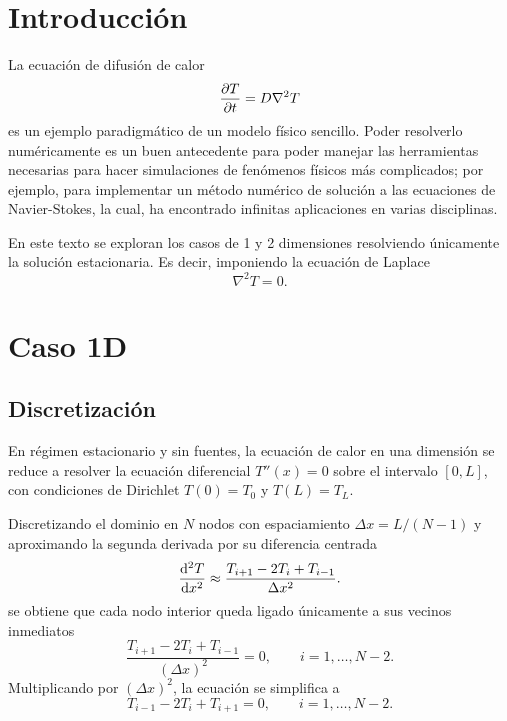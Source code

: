 \documentclass[12pt,twocolumn]{article}
\begin{document}
\tableofcontents
\section{Introducción}

La ecuación de difusión de calor 
$$\pdv{T}{t}=D\nabla^2T$$
es un ejemplo paradigmático de un modelo físico sencillo. Poder resolverlo numéricamente es un buen antecedente para poder manejar las herramientas necesarias para hacer simulaciones de fenómenos físicos más complicados; por ejemplo, para implementar un método numérico de solución a las ecuaciones de Navier-Stokes, la cual, ha encontrado infinitas aplicaciones en varias disciplinas.

En este texto se exploran los casos de 1 y 2 dimensiones resolviendo únicamente la solución estacionaria. Es decir, imponiendo la ecuación de Laplace
$$\nabla^2T = 0.$$



\section{Caso 1D}

\subsection{Discretización}
En régimen estacionario y sin fuentes, la ecuación de calor en una dimensión se reduce a resolver la ecuación diferencial $T''(x) = 0$ sobre el intervalo $[0,L]$, con condiciones de
Dirichlet $T(0)=T_0$ y $T(L)=T_L$.

Discretizando el dominio en $N$ nodos con espaciamiento $\Delta x = L/(N-1)$
y aproximando la segunda derivada por su diferencia centrada
$$
\dv[2]{T}{x}\approx\frac{T_{i+1}-2T_i+T_{i-1}}{\Delta x^2}.
$$
se obtiene que cada nodo interior queda ligado únicamente a sus vecinos inmediatos
\begin{equation}
\frac{T_{i+1}-2T_i+T_{i-1}}{(\Delta x)^2}=0,\qquad i=1,\dots,N-2.
\label{eq:disc}
\end{equation}
Multiplicando por $(\Delta x)^2$, la ecuación se simplifica a
\begin{equation}
T_{i-1}-2T_i+T_{i+1}=0,\qquad i=1,\dots,N-2.
\label{eq:disc-simp}
\end{equation}
\end{document}
